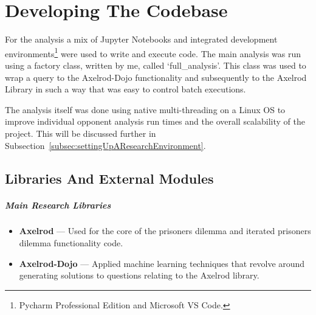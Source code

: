 \chapter{Developing The Codebase}\label{ch:developingthecodebase}
For the analysis a mix of Jupyter Notebooks and integrated development environments\footnote{Pycharm Professional Edition and Microsoft VS Code.} were used to write and execute code.
The main analysis was run using a factory class, written by me, called `full\_analysis'.
This class was used to wrap a query to the Axelrod-Dojo functionality and subsequently to the Axelrod Library in such a way that was easy to control batch executions.

The analysis itself was done using native multi-threading on a Linux OS to improve individual opponent analysis run times and the overall scalability of the project.
This will be discussed further in Subsection~\ref{subsec:settingUpAResearchEnvironment}.

\section{Libraries And External Modules}
\paragraph{Main Research Libraries}
\begin{itemize}
    \item \textbf{Axelrod} --- Used for the core of the prisoners dilemma and iterated prisoners dilemma functionality code.\cite{axelrodproject}
    \item \textbf{Axelrod-Dojo} --- Applied machine learning techniques that revolve around generating solutions to questions relating to the Axelrod library.
\end{itemize}

